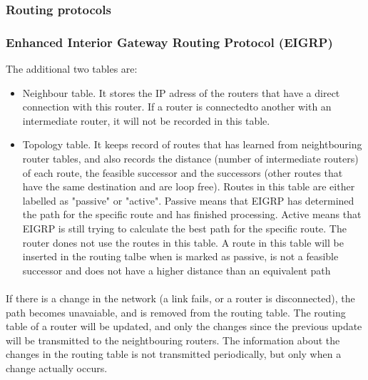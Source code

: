 \subsubsection{Routing protocols}

\subsubsection*{Enhanced Interior Gateway Routing Protocol (EIGRP)\cite{EIGRP}}
The additional two tables are: 
\begin{itemize}
\item Neighbour table. It stores the IP adress of the routers that have a direct connection with this router. If a router is connectedto another with an intermediate router, it will not be recorded in this table.
\item Topology table. It keeps record of routes that has learned from neightbouring router tables, and also records the distance (number of intermediate routers) of each route, the feasible successor and the successors (other routes that have the same destination and are loop free). Routes in this table are either labelled as "passive" or "active". Passive means that EIGRP  has determined the path for the specific route and has finished processing. Active means that EIGRP is still trying to calculate the best path for the specific route. The router dones not use the routes in this table. A route in this table will be inserted in the routing talbe when is marked as passive, is not a feasible successor and does not have a higher distance than an equivalent path
\end{itemize}
\paragraph{}If there is a change in the network (a link fails, or a router is disconnected), the path becomes unavaiable, and is removed from the routing table. The routing table of a router will be updated, and only the changes since the previous update will be transmitted to the neightbouring routers. The information about the changes in the routing table is not transmitted periodically, but only when a change actually occurs.
